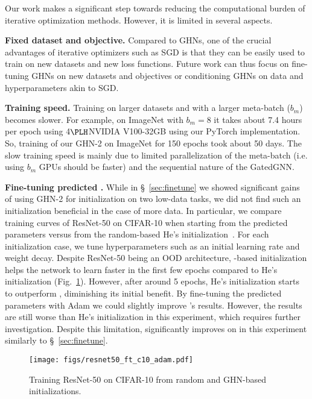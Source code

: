 Our work makes a significant step towards reducing the computational burden of iterative optimization methods. However, it is limited in several aspects.

\textbf{Fixed dataset and objective.} Compared to GHNs, one of the crucial advantages of iterative optimizers such as SGD is that they can be easily used to train on new datasets and new loss functions. Future work can thus focus on fine-tuning GHNs on new datasets and objectives or conditioning GHNs on data and hyperparameters akin to SGD.

\textbf{Training speed.} Training \ghnours on larger datasets and with a larger meta-batch ($b_m$) becomes slower. For example, on ImageNet with $b_m=8$ it takes about 7.4 hours per epoch using 4$\PLH$NVIDIA V100-32GB using our PyTorch implementation. So, training of our GHN-2 on ImageNet for 150 epochs took about 50 days. The slow training speed is mainly due to limited parallelization of the meta-batch (i.e. using $b_m$ GPUs should be faster) and the sequential nature of the GatedGNN. 

\textbf{Fine-tuning predicted \params.}
While in \S~\ref{sec:finetune} we showed significant gains of using GHN-2 for initialization on two low-data tasks, we did not find such an initialization beneficial in the case of more data. 
In particular, we compare training curves of ResNet-50 on CIFAR-10 when starting from the predicted parameters versus from the random-based He's initialization~\cite{he2015delving}.
For each initialization case, we tune hyperparameters such as an initial learning rate and weight decay.
Despite ResNet-50 being an OOD architecture, \ghnours-based initialization helps the network to learn faster in the first few epochs compared to He's initialization
(Fig.~\ref{fig:fine_tune}). 
However, after around 5 epochs, He's initialization starts to outperform \ghnours, diminishing its initial benefit. By fine-tuning the predicted parameters with Adam we could slightly improve \ghnours's results. However, the results are still worse than He's initialization in this experiment, which requires further investigation.
Despite this limitation, \ghnours significantly improves on \ghnbase in this experiment similarly to \S~\ref{sec:finetune}. 



\begin{figure}[htbp]
	\centering
	\texttt{[image: figs/resnet50\_ft\_c10\_adam.pdf]}
	\vspace{-5pt}
	\caption{Training ResNet-50 on CIFAR-10 from random and GHN-based initializations.
	}
	\label{fig:fine_tune}
	\vspace{-5pt}
\end{figure}


